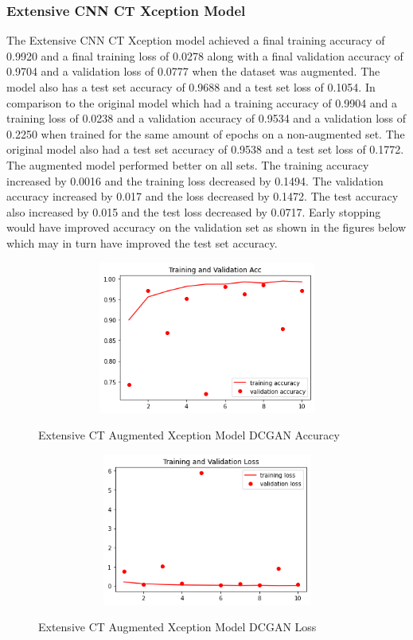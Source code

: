 \subsubsection{Extensive CNN CT Xception Model}
The Extensive CNN CT Xception model achieved a final training accuracy of 0.9920 and a final training loss of 0.0278 along with a final validation accuracy of 0.9704 and a validation loss of 0.0777 when the dataset was augmented.  The model also has a test set accuracy of 0.9688 and a test set loss of 0.1054.  In comparison to the original model which had a training accuracy of 0.9904  and a training loss of 0.0238 and a validation accuracy of 0.9534 and a validation loss of 0.2250 when trained for the same amount of epochs on a non-augmented set.  The original model also had a test set accuracy of 0.9538 and a test set loss of 0.1772.  The augmented model performed better on all sets.  The training accuracy increased by 0.0016 and the training loss decreased by 0.1494. The validation accuracy increased by 0.017 and the loss decreased by 0.1472. The test accuracy also increased by 0.015 and the test loss decreased by 0.0717.  Early stopping would have improved accuracy on the validation set as shown in the figures below which may in turn have improved the test set accuracy.
 \begin{figure}[H]
    \centering    \includegraphics[width=1\textwidth,height=5cm,keepaspectratio]{Images/XceptionBaselineTrainingValidationAccuracyExtensiveCTAugmentedDCGAN.png}\\
    \caption{Extensive CT Augmented Xception Model DCGAN Accuracy}
    \label{fig:Extensive CT Augmented Xception Model DCGAN Accuracy}
\end{figure}
 \begin{figure}[H]
    \centering
    \includegraphics[width=1\textwidth,height=5cm,keepaspectratio]{Images/XceptionBaselineTrainingValidationLossExtensiveCTAugmentedDCGAN.png}\\
    \caption{Extensive CT Augmented Xception Model DCGAN Loss}
    \label{fig:Extensive CT Augmented Xception Model DCGAN Loss}
\end{figure}
